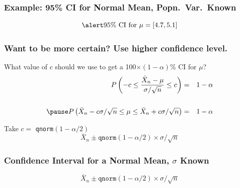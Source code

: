 \documentclass[handout]{beamer}
\begin{document}
\begin{frame}
\frametitle{Example: 95\% CI for Normal Mean, Popn.\ Var.\ Known}

\begin{center}
\end{center}

	$$\alert{\mbox{95\% CI for } \mu = [4.7, 5.1]}$$




\end{frame}
\begin{frame}
\frametitle{Want to be more certain? Use higher confidence level.}
What value of $c$ should we use to get a 100$\times(1-\alpha)$\% CI for $\mu$?
	\begin{eqnarray*}
		P\left(-c \leq \frac{\bar{X}_n-\mu}{\sigma/\sqrt{n}} \leq c \right) &=& 1-\alpha \\ \\ \pause
		P\left(\bar{X}_n - c \sigma/\sqrt{n} \leq \mu\leq \bar{X}_n + c \sigma/\sqrt{n} \right) &=& 1-\alpha 
	\end{eqnarray*}
 \pause

\alert{Take $c =$ \texttt{qnorm}$(1-\alpha/2)$} \pause
	$$\bar{X}_n \pm \texttt{qnorm}(1-\alpha/2) \times \sigma/\sqrt{n}$$
\end{frame}
\begin{frame}
\frametitle{Confidence Interval for a Normal Mean, $\sigma$ Known}
\Large
$$\boxed{\bar{X}_n \pm \texttt{qnorm}(1-\alpha/2) \times \sigma/\sqrt{n}}$$
\end{frame}
\end{document}
